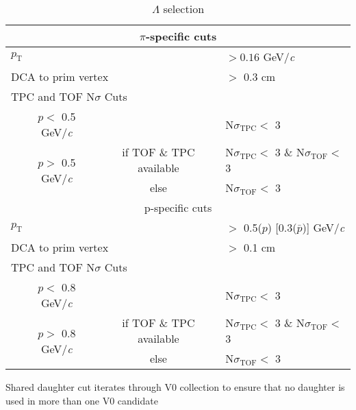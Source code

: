 \documentclass[ALICE,manyauthors]{cernphprep}
\begin{document}
\begin{table}[htbp]
\begin{tabular}{lc|c|l}
   
   \multicolumn{4}{c}{$\pi$-specific cuts} \\
   \hline
   \multicolumn{3}{l|}{$p_{\mathrm{T}}$} & $> 0.16$ GeV/\textit{c} \\
   \hline
   \multicolumn{3}{l|}{DCA to prim vertex} & $>$ 0.3 cm \\
   \hline
   \multicolumn{4}{l}{TPC and TOF N$\sigma$ Cuts} \\
   \hline
    & \multicolumn{1}{c}{$p <$ 0.5 GeV/\textit{c}} &  & N$\sigma_{\mathrm{TPC}} <$ 3 \\
   \hline
    & \multirow{2}{*}{$p >$ 0.5 GeV/\textit{c}} &  if TOF \& TPC available & N$\sigma_{\mathrm{TPC}} <$ 3 \& N$\sigma_{\mathrm{TOF}} <$ 3 \\
   \cline{3-4}
    & & else & N$\sigma_{\mathrm{TOF}} <$ 3 \\
   \hline
   
   
   \multicolumn{4}{c}{p-specific cuts} \\
   \hline
   \multicolumn{3}{l|}{$p_{\mathrm{T}}$} & $ > $ 0.5($p$) [0.3($\bar{p}$)] GeV/\textit{c} \\
   \hline
   \multicolumn{3}{l|}{DCA to prim vertex} & $>$ 0.1 cm \\
   \hline
   \multicolumn{4}{l}{TPC and TOF N$\sigma$ Cuts} \\
   \hline
    & \multicolumn{1}{c}{$p <$ 0.8 GeV/\textit{c}} & & N$\sigma_{\mathrm{TPC}} <$ 3 \\
   \hline
    & \multirow{2}{*}{$p >$ 0.8 GeV/\textit{c}} &  if TOF \& TPC available & N$\sigma_{\mathrm{TPC}} <$ 3 \& N$\sigma_{\mathrm{TOF}} <$ 3 \\
   \cline{3-4}
    & & else & N$\sigma_{\mathrm{TOF}} <$ 3 \\
   \hline   
  \end{tabular}
 \caption{$\Lambda$ selection}
 \label{tab:LamCuts} 
\end{table}


Shared daughter cut iterates through V0 collection to ensure that no daughter is used in more than one V0 candidate
\end{document}
